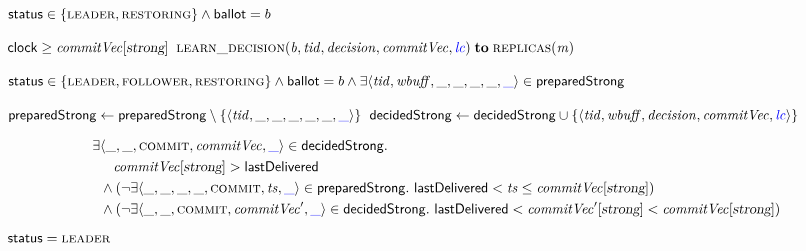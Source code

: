 \begin{algorithm*}[t]
\begin{algorithmic}[1]
    \Statex
    \WhenRcv[$\decision(\ballotvar, \tidvar, \decisionvar, \commitvc, \lccolor{\lcvar})$]
      \label{line:function-decision}
      \State \pre ${\sf status} \in \{\textsc{leader}, \textsc{restoring}\} \land {\sf ballot} = b$
        \label{line:decision-precondition}

      \hStatex
      \State \wait\until ${\sf clock} \ge \mathit{commitVec}[\textsl{strong}]$
        \label{line:decision-wait-clock}
      \State \send $\Call{\learndecision}{\ballotvar, \tidvar, \decisionvar, \commitvc, \lccolor{\lcvar}}
        \sendto \replicas(\mvar)$
        \label{line:decision-call-desision}
    \EndWhenRcv

    \Statex
    \WhenRcv[$\learndecision(\ballotvar, \tidvar, \decisionvar, \commitvc, \lccolor{\lcvar})$]
      \label{function:learndecision}
      \State \pre ${\sf status} \in \{\textsc{leader}, \textsc{follower}, \textsc{restoring}\} \land {\sf ballot} = b
        \land \exists \langle \mathit{tid}, \mathit{wbuff}, \_, \_, \_, \_, \textcolor{blue}{\_} \rangle \in {\sf preparedStrong}$
        \label{line:learndecision-precondition}

      \hStatex
      \State ${\sf preparedStrong} \gets {\sf preparedStrong} \setminus
        \{\langle \mathit{tid}, \_, \_, \_, \_, \_, \textcolor{blue}{\_} \rangle\}$
        \label{line:decision-preparedstrong}
      \State ${\sf decidedStrong} \gets {\sf decidedStrong} \cup
        \{\langle \mathit{tid}, \mathit{wbuff}, \mathit{decision}, \mathit{commitVec}, \textcolor{blue}{\mathit{lc}} \rangle\}$
        \label{line:decision-decidedstrong}
    \EndWhenRcv

    \Statex \Upon[] \label{function:upcall} \label{line:function-upcall}
      \Statex \vspace{-0.70cm}
        \begin{align*}
          \exists &\langle \_, \_, \textsc{commit}, \mathit{commitVec}, \textcolor{blue}{\_} \rangle \in {\sf decidedStrong}. \\
            &\phantom{\land\;} \mathit{commitVec}[\textsl{strong}] > {\sf lastDelivered} \\
            &\land (\lnot\exists \langle \_, \_, \_, \_, \textsc{commit}, \mathit{ts}, \textcolor{blue}{\_} \rangle \in {\sf preparedStrong}.\
            {\sf lastDelivered} < \mathit{ts} \le \mathit{commitVec}[\textsl{strong}]) \\
            &\land (\lnot\exists \langle \_, \_, \textsc{commit}, \mathit{commitVec}', \textcolor{blue}{\_} \rangle \in {\sf decidedStrong}.\
            {\sf lastDelivered} < \mathit{commitVec}'[\textsl{strong}] < \mathit{commitVec}[\textsl{strong}])
        \end{align*}
        \label{line:upcall-upon}
      \Statex \vspace{-1.10cm}
      \State \pre ${\sf status} = \textsc{leader}$
        \label{line:upcall-precondition}


\end{algorithmic}
\end{algorithm*}
